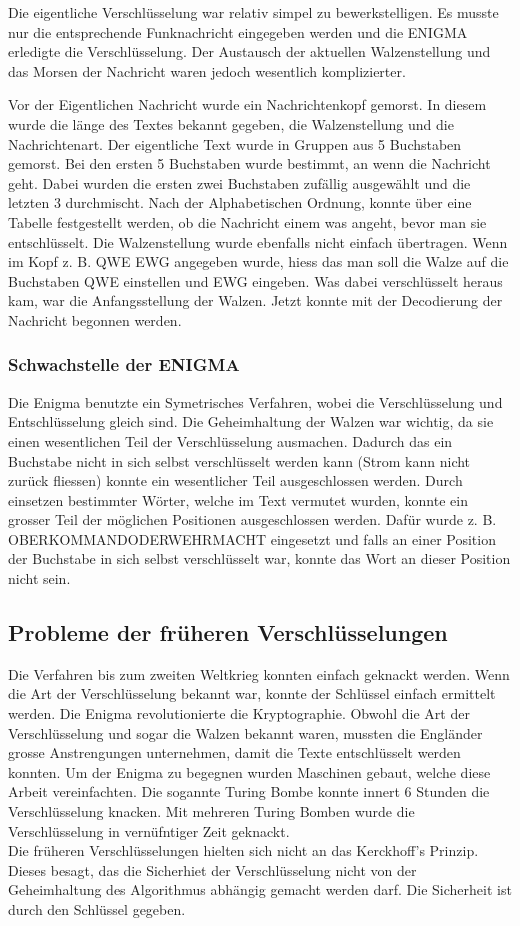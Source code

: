 Die eigentliche Verschlüsselung war relativ simpel zu bewerkstelligen. Es musste nur die entsprechende Funknachricht eingegeben werden und die ENIGMA erledigte die Verschlüsselung. Der Austausch der aktuellen Walzenstellung und das Morsen der Nachricht waren jedoch wesentlich komplizierter.

Vor der Eigentlichen Nachricht wurde ein Nachrichtenkopf gemorst. In diesem wurde die länge des Textes bekannt gegeben, die Walzenstellung und die Nachrichtenart. 
Der eigentliche Text wurde in Gruppen aus 5 Buchstaben gemorst. Bei den ersten 5 Buchstaben wurde bestimmt, an wenn die Nachricht geht. Dabei wurden die ersten zwei Buchstaben zufällig ausgewählt und die letzten 3 durchmischt. Nach der Alphabetischen Ordnung, konnte über eine Tabelle festgestellt werden, ob die Nachricht einem was angeht, bevor man sie entschlüsselt.
Die Walzenstellung wurde ebenfalls nicht einfach übertragen. Wenn im Kopf z. B. QWE EWG angegeben wurde, hiess das man soll die Walze auf die Buchstaben QWE einstellen und EWG eingeben. Was dabei verschlüsselt heraus kam, war die Anfangsstellung der Walzen. Jetzt konnte mit der Decodierung der Nachricht begonnen werden.

\subsubsection{Schwachstelle der ENIGMA}
Die Enigma benutzte ein Symetrisches Verfahren, wobei die Verschlüsselung und Entschlüsselung gleich sind. %
Die Geheimhaltung der Walzen war wichtig, da sie einen wesentlichen Teil der Verschlüsselung ausmachen.
Dadurch das ein Buchstabe nicht in sich selbst verschlüsselt werden kann (Strom kann nicht zurück fliessen) konnte ein wesentlicher Teil ausgeschlossen werden.
Durch einsetzen bestimmter Wörter, welche im Text vermutet wurden, konnte ein grosser Teil der möglichen Positionen ausgeschlossen werden. Dafür wurde z. B. OBERKOMMANDODERWEHRMACHT eingesetzt und falls an einer Position der Buchstabe in sich selbst verschlüsselt war, konnte das Wort an dieser Position nicht sein.

\subsection{Probleme der früheren Verschlüsselungen}
Die Verfahren bis zum zweiten Weltkrieg konnten einfach geknackt werden. Wenn die Art der Verschlüsselung bekannt war, konnte der Schlüssel einfach ermittelt werden. 
Die Enigma revolutionierte die Kryptographie. Obwohl die Art der Verschlüsselung und sogar die Walzen bekannt waren, mussten die Engländer grosse Anstrengungen unternehmen, damit die Texte entschlüsselt werden konnten. Um der Enigma zu begegnen wurden Maschinen gebaut, welche diese Arbeit vereinfachten. Die sogannte Turing Bombe konnte innert 6 Stunden die Verschlüsselung knacken. 
Mit mehreren Turing Bomben wurde die Verschlüsselung in vernüfntiger Zeit geknackt. \\[2ex]
%
Die früheren Verschlüsselungen hielten sich nicht an das Kerckhoff's Prinzip. Dieses besagt, das die Sicherhiet der Verschlüsselung nicht von der Geheimhaltung des Algorithmus abhängig gemacht werden darf. Die Sicherheit ist durch den Schlüssel gegeben. 
